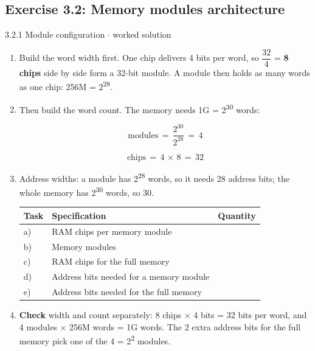 \documentclass[11pt]{article}
\begin{document}
\begin{keepsection}\subsection{Exercise 3.2: Memory modules architecture}

\begin{workedbox}{3.2.1 Module configuration \ensuremath{\cdot} worked solution}
\begin{enumerate}
\item Build the word width first. One chip delivers 4 bits per word, so {\small\ensuremath{\dfrac{32}{4}}} = \textbf{8 chips} side by side form a 32-bit module. A module then holds as many words as one chip: 256M = 2\textsuperscript{28}.
\item {}
Then build the word count. The memory needs 1G = 2\textsuperscript{30} words:

\begin{equation*}\text{modules}\, =\, \dfrac{2^{30}}{2^{28}}\, =\, 4\end{equation*}

\begin{equation*}\text{chips}\, =\, 4\, \times \, 8\, =\, 32\end{equation*}
\item {}
Address widths: a module has 2\textsuperscript{28} words, so it needs 28 address bits; the whole memory has 2\textsuperscript{30} words, so 30.

\begin{center}\small\begin{tabularx}{\linewidth}{>{\raggedright\arraybackslash}X>{\raggedright\arraybackslash}X>{\raggedright\arraybackslash}X}\toprule
\textbf{Task} & \textbf{Specification} & \textbf{Quantity} \\ \midrule
a) & RAM chips per memory module & 8 \\
b) & Memory modules & 4 \\
c) & RAM chips for the full memory & 32 \\
d) & Address bits needed for a memory module & 28 \\
e) & Address bits needed for the full memory & 30 \\
\bottomrule\end{tabularx}\end{center}
\item \textbf{Check} width and count separately: 8 chips \ensuremath{\times} 4 bits = 32 bits per word, and 4 modules \ensuremath{\times} 256M words = 1G words. The 2 extra address bits for the full memory pick one of the 4 = 2\textsuperscript{2} modules.
\end{enumerate}
\end{workedbox}

\end{keepsection}
\end{document}
